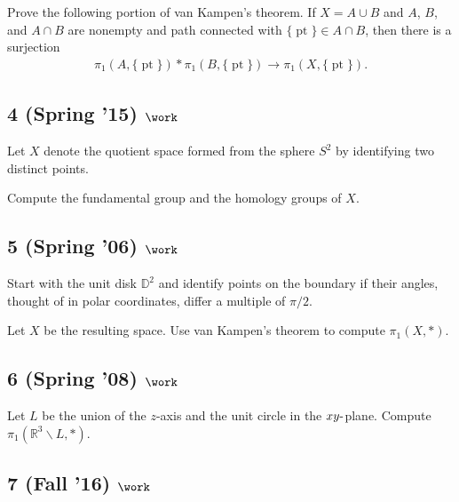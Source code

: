 Prove the following portion of van Kampen's theorem. If \(X = A\cup B\)
and \(A\), \(B\), and \(A \cap B\) are nonempty and path connected with
\({\{\operatorname{pt}\}}\in A \cap B\), then there is a surjection
\begin{align*}
\pi_1 (A, {\{\operatorname{pt}\}}) \ast \pi_1 (B, {\{\operatorname{pt}\}}) \to \pi_1 (X, {\{\operatorname{pt}\}})
.\end{align*}

\hypertarget{spring-15-work-1}{%
\subsection{\texorpdfstring{4 (Spring '15)
\(\work\)}{4 (Spring '15) \textbackslash work}}\label{spring-15-work-1}}

Let \(X\) denote the quotient space formed from the sphere \(S^2\) by
identifying two distinct points.

Compute the fundamental group and the homology groups of \(X\).

\hypertarget{spring-06-work-2}{%
\subsection{\texorpdfstring{5 (Spring '06)
\(\work\)}{5 (Spring '06) \textbackslash work}}\label{spring-06-work-2}}

Start with the unit disk \({\mathbb{D}}^2\) and identify points on the
boundary if their angles, thought of in polar coordinates, differ a
multiple of \(\pi/2\).

Let \(X\) be the resulting space. Use van Kampen's theorem to compute
\(\pi_1 (X, \ast)\).

\hypertarget{spring-08-work}{%
\subsection{\texorpdfstring{6 (Spring '08)
\(\work\)}{6 (Spring '08) \textbackslash work}}\label{spring-08-work}}

Let \(L\) be the union of the \(z\)-axis and the unit circle in the
\(xy{\hbox{-}}\)plane. Compute
\(\pi_1 ({\mathbb{R}}^3 \backslash L, \ast)\).

\hypertarget{fall-16-work-2}{%
\subsection{\texorpdfstring{7 (Fall '16)
\(\work\)}{7 (Fall '16) \textbackslash work}}\label{fall-16-work-2}}

